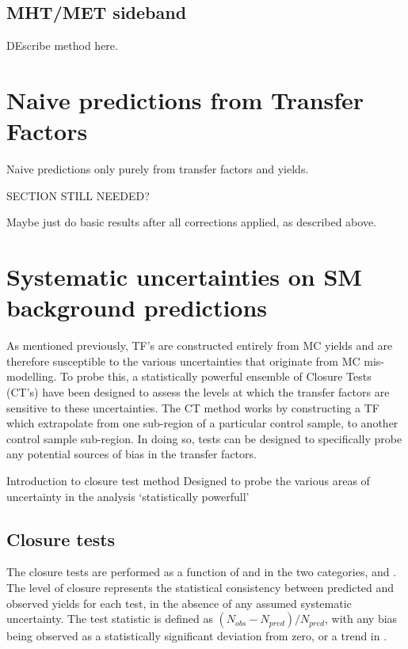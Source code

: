 \subsection{MHT/MET sideband}
DEscribe method here.

\section{Naive predictions from Transfer Factors}  %
\label{sec:background_predictions}
Naive predictions only purely from transfer factors and yields.

SECTION STILL NEEDED?

Maybe just do basic results after all corrections applied, as described above.

\section{Systematic uncertainties on SM background predictions}  %
\label{sec:background_systematics}

As mentioned previously, TF's are constructed entirely from MC yields and are 
therefore susceptible to the various uncertainties that originate from MC mis-
modelling. To probe this, a statistically powerful ensemble of Closure Tests
(CT's) have been designed to assess the levels at which the transfer factors are 
sensitive to these uncertainties. The CT method works by constructing a TF which
extrapolate from one sub-region of a particular control sample, to another 
control sample sub-region. In doing so, tests can be designed to specifically 
probe any potential sources of bias in the transfer factors.

Introduction to closure test method
Designed to probe the various areas of uncertainty in the analysis
`statistically powerfull'

\subsection{Closure tests}

The closure tests are performed as a function of \HT and in the two \nj categories,
\njlow and \njhigh. The level of closure represents the statistical 
consistency between predicted and observed yields for each test, in the absence 
of any assumed systematic uncertainty. The test statistic is defined as $(N_{obs}
- N_{pred}) / N_{pred}$, with any bias being observed as a statistically 
significant deviation from zero, or a trend in \HT.


